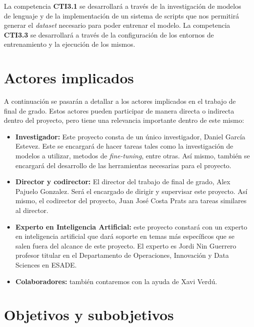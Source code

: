 La competencia \textbf{CTI3.1} se desarrollará a través de la investigación de modelos de
lenguaje y de la implementación de un sistema de scripts que nos permitirá generar
el \textit{dataset} necesario para poder entrenar el modelo. La competencia \textbf{CTI3.3}
se desarrollará a través de la configuración de los entornos de entrenamiento y
la ejecución de los mismos.

\section{Actores implicados}
\label{sec:actores}


A continuación se pasarán a detallar a los actores implicados en el trabajo de final
de grado. Estos actores pueden participar de manera directa o indirecta dentro del
proyecto, pero tiene una relevancia importante dentro de este mismo:

\begin{itemize}
    \item \textbf{Investigador:} Este proyecto consta de un único investigador, Daniel
        García Estevez. Este se encargará de hacer tareas tales como la investigación
        de modelos a utilizar, metodos de \textit{fine-tuning}, entre otras. Así mismo,
        también se encargará del desarrollo de las herramientas necesarias para el proyecto.
    \item \textbf{Director y codirector:} El director del trabajo de final de grado, Alex
        Pajuelo Gonzalez. Será el encargado de dirigir y supervisar este proyecto. Así
        mismo, el codirector del proyecto, Juan José Costa Prats ara tareas similares al director.
    \item \textbf{Experto en Inteligencia Artificial:} este proyecto constará con un experto en
        inteligencia artificial que dará soporte en temas más específicos que se salen fuera del
        alcance de este proyecto. El experto es Jordi Nin Guerrero profesor titular en el
        Departamento de Operaciones, Innovación y Data Sciences en ESADE.
    \item \textbf{Colaboradores:} también contaremos con la ayuda de Xavi Verdú.
\end{itemize}

\section{Objetivos y subobjetivos}
\label{sec:objetivos}

